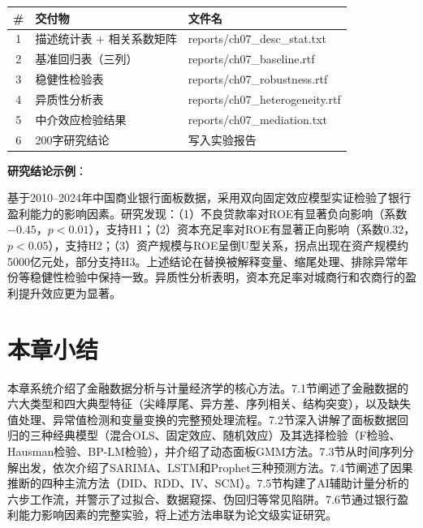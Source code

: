 \begin{table}[H]
\centering
\begin{tabular}{cll}
\toprule
\textbf{\#} & \textbf{交付物} & \textbf{文件名} \\
\midrule
1 & 描述统计表 + 相关系数矩阵 & reports/ch07\_desc\_stat.txt \\
2 & 基准回归表（三列） & reports/ch07\_baseline.rtf \\
3 & 稳健性检验表 & reports/ch07\_robustness.rtf \\
4 & 异质性分析表 & reports/ch07\_heterogeneity.rtf \\
5 & 中介效应检验结果 & reports/ch07\_mediation.txt \\
6 & 200字研究结论 & 写入实验报告 \\
\bottomrule
\end{tabular}
\end{table}

\textbf{研究结论示例}：

基于2010--2024年中国商业银行面板数据，采用双向固定效应模型实证检验了银行盈利能力的影响因素。研究发现：（1）不良贷款率对ROE有显著负向影响（系数$-0.45$，$p<0.01$），支持H1；（2）资本充足率对ROE有显著正向影响（系数$0.32$，$p<0.05$），支持H2；（3）资产规模与ROE呈倒U型关系，拐点出现在资产规模约5000亿元处，部分支持H3。上述结论在替换被解释变量、缩尾处理、排除异常年份等稳健性检验中保持一致。异质性分析表明，资本充足率对城商行和农商行的盈利提升效应更为显著。

\section*{本章小结}


本章系统介绍了金融数据分析与计量经济学的核心方法。7.1节阐述了金融数据的六大类型和四大典型特征（尖峰厚尾、异方差、序列相关、结构突变），以及缺失值处理、异常值检测和变量变换的完整预处理流程。7.2节深入讲解了面板数据回归的三种经典模型（混合OLS、固定效应、随机效应）及其选择检验（F检验、Hausman检验、BP-LM检验），并介绍了动态面板GMM方法。7.3节从时间序列分解出发，依次介绍了SARIMA、LSTM和Prophet三种预测方法。7.4节阐述了因果推断的四种主流方法（DID、RDD、IV、SCM）。7.5节构建了AI辅助计量分析的六步工作流，并警示了过拟合、数据窥探、伪回归等常见陷阱。7.6节通过银行盈利能力影响因素的完整实验，将上述方法串联为论文级实证研究。


